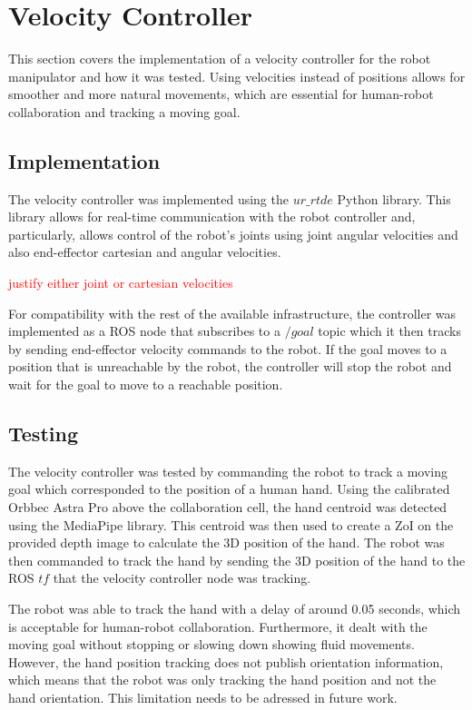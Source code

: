 \section{Velocity Controller}

This section covers the implementation of a velocity controller for the robot manipulator and how it was tested. Using velocities instead of positions allows for smoother and more natural movements, which are essential for human-robot collaboration and tracking a moving goal.

\subsection{Implementation}

The velocity controller was implemented using the $ur\_rtde$ Python library. This library allows for real-time communication with the robot controller and, particularly, allows control of the robot's joints using joint angular velocities and also end-effector cartesian and angular velocities. 

\textcolor{red}{justify either joint or cartesian velocities}

For compatibility with the rest of the available infrastructure, the controller was implemented as a ROS node that subscribes to a $/goal$ topic which it then tracks by sending end-effector velocity commands to the robot. If the goal moves to a position that is unreachable by the robot, the controller will stop the robot and wait for the goal to move to a reachable position.

\subsection{Testing}

The velocity controller was tested by commanding the robot to track a moving goal which corresponded to the position of a human hand. Using the calibrated Orbbec Astra Pro above the collaboration cell, the hand centroid was detected using the MediaPipe library. This centroid was then used to create a ZoI on the provided depth image to calculate the 3D position of the hand. The robot was then commanded to track the hand by sending the 3D position of the hand to the ROS $tf$ that the velocity controller node was tracking.

The robot was able to track the hand with a delay of around 0.05 seconds, which is acceptable for human-robot collaboration. Furthermore, it dealt with the moving goal without stopping or slowing down showing fluid movements. However, the hand position tracking does not publish orientation information, which means that the robot was only tracking the hand position and not the hand orientation. This limitation needs to be adressed in future work.
